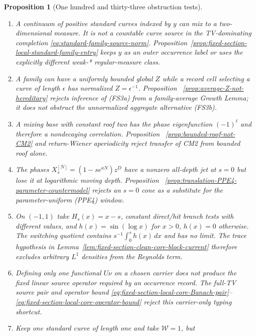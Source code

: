 \documentclass[11pt]{article}
\newtheorem{proposition}[theorem]{Proposition}
\begin{document}
\begin{proposition}[One hundred and thirty-three obstruction tests]
\begin{enumerate}[label=\textup{(T\arabic*)}]
      atoms at zero.  The switching jump
      \eqref{eq:clean-core-switching-current} and the trace identity
      \eqref{eq:fixed-section-tangency-trace-identity} forbid deleting just
      one artificial boundary current.
\item A continuum of positive standard curves indexed by $y$ can mix to a
      two-dimensional measure.  It is not a countable curve source in the
      TV-dominating completion \eqref{eq:standard-family-source-norm}.
      Proposition~\ref{prop:fixed-section-local-standard-family-entry} keeps
      $y$ as an outer occurrence label or uses the explicitly different
      weak-* regular-measure class.
\item A family can have a uniformly bounded global $Z$ while a record cell
      selecting a curve of length $\epsilon$ has normalized
      $Z=\epsilon^{-1}$.  Proposition~
      \ref{prop:average-Z-not-hereditary} rejects inference of
      \textup{(FS3a)} from a family-average Growth Lemma; it does not
      obstruct the unnormalized aggregate alternative \textup{(FS3b)}.
\item A mixing base with constant roof two has the phase eigenfunction
      $(-1)^\ell$ and therefore a nondecaying correlation.  Proposition~
      \ref{prop:bounded-roof-not-CM2} and return-Wiener aperiodicity reject
      transfer of CM2 from bounded roof alone.
\item The phases $X_s^{[N]}=(1-se^{aN})z^D$ have a nonzero all-depth jet at
      $s=0$ but lose it at logarithmic moving depth.  Proposition~
      \ref{prop:translation-PPE4-parameter-countermodel} rejects an
      $s=0$ cone as a substitute for the parameter-uniform \textup{(PPE4)}
      window.
\item On $(-1,1)$ take $H_s(x)=x-s$, constant direct/hit branch tests with
      different values, and
      $h(x)=\sin(\log x)$ for $x>0$, $h(x)=0$ otherwise.  The switching
      quotient contains $s^{-1}\int_0^sh(x)\,dx$ and has no limit.  The
      trace hypothesis in
      Lemma~\ref{lem:fixed-section-clean-core-block-current} therefore
      excludes arbitrary $L^1$ densities from the Reynolds term.
\item Defining only one functional $U\nu$ on a chosen carrier does not
      produce the fixed linear source operator required by an occurrence
      record.  The full-TV source pair and operator bound
      \eqref{eq:fixed-section-local-core-Banach-pair}--
      \eqref{eq:fixed-section-local-core-operator-bound} reject this
      carrier-only typing shortcut.
\item Keep one standard curve of length one and take $\mathscr W=1$, but

\end{enumerate}
\end{proposition}
\end{document}
